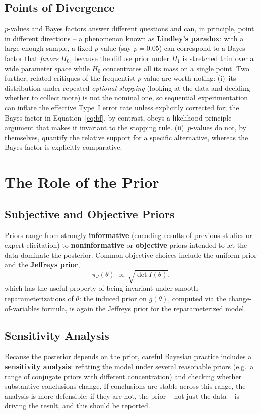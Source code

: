 \documentclass[11pt,a4paper]{article}
\begin{document}
\subsection{Points of Divergence}
$p$-values and Bayes factors answer different questions and can, in principle, point in different directions -- a phenomenon known as \textbf{Lindley's paradox}: with a large enough sample, a fixed $p$-value (say $p=0.05$) can correspond to a Bayes factor that \emph{favors} $H_0$, because the diffuse prior under $H_1$ is stretched thin over a wide parameter space while $H_0$ concentrates all its mass on a single point. Two further, related critiques of the frequentist $p$-value are worth noting: (i)~its distribution under repeated \emph{optional stopping} (looking at the data and deciding whether to collect more) is not the nominal one, so sequential experimentation can inflate the effective Type~I error rate unless explicitly corrected for; the Bayes factor in Equation~\eqref{eq:bf}, by contrast, obeys a likelihood-principle argument that makes it invariant to the stopping rule. (ii)~$p$-values do not, by themselves, quantify the relative support for a specific alternative, whereas the Bayes factor is explicitly comparative.

\section{The Role of the Prior}

\subsection{Subjective and Objective Priors}
Priors range from strongly \textbf{informative} (encoding results of previous studies or expert elicitation) to \textbf{noninformative} or \textbf{objective} priors intended to let the data dominate the posterior. Common objective choices include the uniform prior and the \textbf{Jeffreys prior},
\begin{equation}
\pi_J(\theta) \;\propto\; \sqrt{\det I(\theta)},
\end{equation}
which has the useful property of being invariant under smooth reparameterizations of $\theta$: the induced prior on $g(\theta)$, computed via the change-of-variables formula, is again the Jeffreys prior for the reparameterized model.

\subsection{Sensitivity Analysis}
Because the posterior depends on the prior, careful Bayesian practice includes a \textbf{sensitivity analysis}: refitting the model under several reasonable priors (e.g.\ a range of conjugate priors with different concentration) and checking whether substantive conclusions change. If conclusions are stable across this range, the analysis is more defensible; if they are not, the prior -- not just the data -- is driving the result, and this should be reported.
\end{document}
